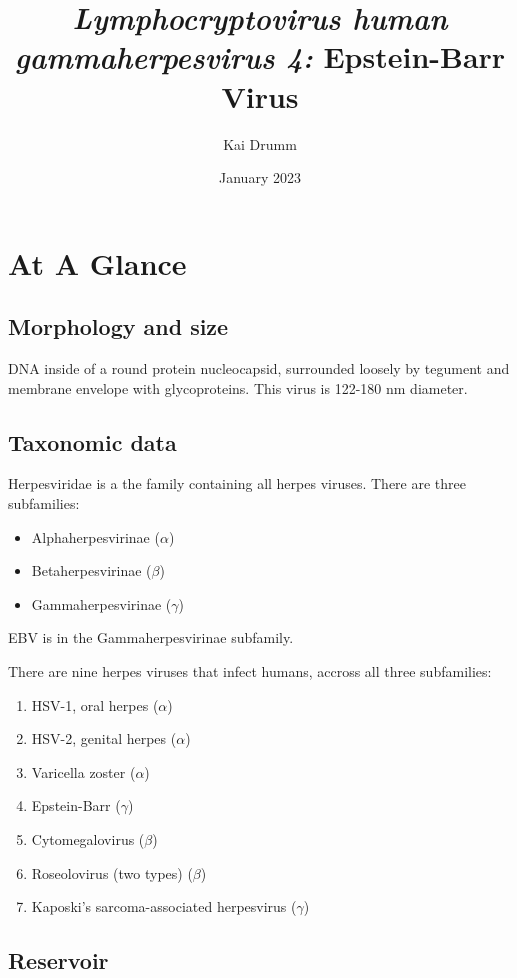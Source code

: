 \documentclass{article}
\title{\textit{Lymphocryptovirus human gammaherpesvirus 4:} Epstein-Barr Virus}
\author{Kai Drumm}
\date{January 2023}
\begin{document}
\maketitle

\section{At A Glance}

\subsection{Morphology and size}

DNA inside of a round protein nucleocapsid, surrounded loosely by tegument and membrane envelope with glycoproteins. This virus is 122-180 nm diameter.

\subsection{Taxonomic data}

Herpesviridae is a the family containing all herpes viruses. There are three subfamilies: 
\begin{itemize}
    \item Alphaherpesvirinae ($\alpha$) 
    \item Betaherpesvirinae ($\beta$)
    \item Gammaherpesvirinae ($\gamma$)
\end{itemize}

\noindent EBV is in the Gammaherpesvirinae subfamily. \newline

There are nine herpes viruses that infect humans, accross all three subfamilies:
\begin{enumerate}
    \item HSV-1, oral herpes ($\alpha$)
    \item HSV-2, genital herpes ($\alpha$)
    \item Varicella zoster ($\alpha$)
    \item Epstein-Barr ($\gamma$)
    \item Cytomegalovirus ($\beta$)
    \item Roseolovirus (two types) ($\beta$)
    \item Kaposki's sarcoma-associated herpesvirus ($\gamma$)
\end{enumerate}

\subsection{Reservoir}
\end{document}
